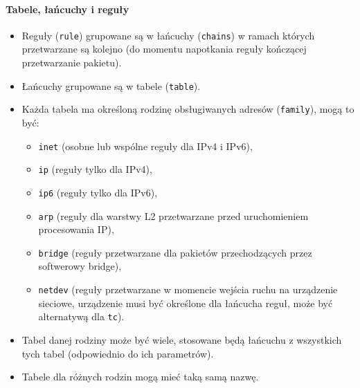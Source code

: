 \paragraph{Tabele, łańcuchy i reguły}
\begin{itemize}
	\item Reguły (\Verb#rule#) grupowane są w łańcuchy (\Verb#chains#) w ramach których przetwarzane są kolejno (do momentu napotkania reguły kończącej przetwarzanie pakietu).
	\item Łańcuchy grupowane są w tabele (\Verb#table#).
	\item Każda tabela ma określoną rodzinę obsługiwanych adresów (\Verb#family#), mogą to być:
	\begin{itemize}
		\item \Verb#inet#   (osobne lub wspólne reguły dla IPv4 i IPv6),
			\item \Verb#ip#  (reguły tylko dla IPv4),
			\item \Verb#ip6# (reguły tylko dla IPv6),
		\item \Verb#arp#    (reguły dla warstwy L2 przetwarzane przed uruchomieniem procesowania IP),
		\item \Verb#bridge# (reguły przetwarzane dla pakietów przechodzących przez softwerowy bridge),
		\item \Verb#netdev# (reguły przetwarzane w momencie wejścia ruchu na urządzenie sieciowe, urządzenie musi być określone dla łańcucha reguł, może być alternatywą dla \Verb#tc#).
	\end{itemize}
	\item Tabel danej rodziny może być wiele, stosowane będą łańcuchu z wszystkich tych tabel (odpowiednio do ich parametrów).
	\item Tabele dla różnych rodzin mogą mieć taką samą nazwę.
\end{itemize}

